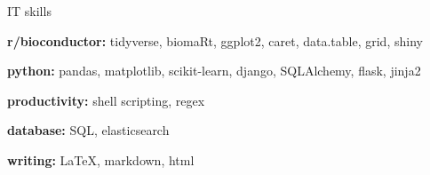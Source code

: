 

\begin{cvskills}
  \cvskill
    {IT skills} %
    {
      \begin{cvitems}
        \item {\textbf{r/bioconductor:} tidyverse, biomaRt, ggplot2, caret, data.table, grid, shiny}
        \item {\textbf{python:} pandas, matplotlib, scikit-learn, django, SQLAlchemy, flask, jinja2}
        \item {\textbf{productivity:} shell scripting, regex}
        \item {\textbf{database:} SQL, elasticsearch}
        \item {\textbf{writing:} LaTeX, markdown, html}
      \end{cvitems}
      }
      

\end{cvskills}
